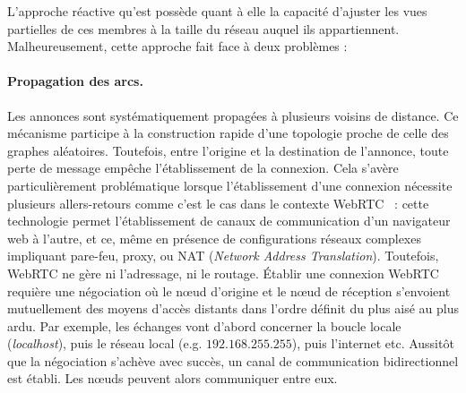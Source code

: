 L'approche réactive qu'est \SCAMP possède quant à elle la capacité d'ajuster les
vues partielles de ces membres à la taille du réseau auquel ils
appartiennent. Malheureusement, cette approche fait face à deux problèmes :

\paragraph{Propagation des arcs.} Les annonces sont systématiquement propagées à
plusieurs voisins de distance. Ce mécanisme participe à la construction rapide
d'une topologie proche de celle des graphes aléatoires. Toutefois, entre
l'origine et la destination de l'annonce, toute perte de message empêche
l'établissement de la connexion. Cela s'avère particulièrement problématique
lorsque l'établissement d'une connexion nécessite plusieurs allers-retours comme
c'est le cas dans le contexte WebRTC~\cite{webrtc} : 
cette technologie permet l'établissement de canaux de communication d'un
navigateur web à l'autre, et ce, même en présence de configurations réseaux
complexes impliquant pare-feu, proxy, ou NAT (\emph{Network Address
  Translation}). Toutefois, WebRTC ne gère ni l'adressage, ni le routage.
Établir une connexion WebRTC requière une négociation où le nœud d'origine et le
nœud de réception s'envoient mutuellement des moyens d'accès distants dans
l'ordre définit du plus aisé au plus ardu. Par exemple, les échanges vont
d'abord concerner la boucle locale (\emph{localhost}), puis le réseau local
(e.g. $192.168.255.255$), puis l'internet etc. Aussitôt que la négociation
s'achève avec succès, un canal de communication bidirectionnel est établi. Les
nœuds peuvent alors communiquer entre eux.

